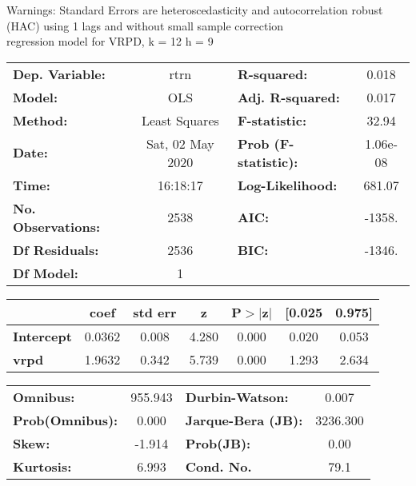 Warnings: \newline
 [1] Standard Errors are heteroscedasticity and autocorrelation robust (HAC) using 1 lags and without small sample correction\\ 

regression model for VRPD, k = 12 h = 9\begin{center}
\begin{tabular}{lclc}
\toprule
\textbf{Dep. Variable:}    &       rtrn       & \textbf{  R-squared:         } &     0.018   \\
\textbf{Model:}            &       OLS        & \textbf{  Adj. R-squared:    } &     0.017   \\
\textbf{Method:}           &  Least Squares   & \textbf{  F-statistic:       } &     32.94   \\
\textbf{Date:}             & Sat, 02 May 2020 & \textbf{  Prob (F-statistic):} &  1.06e-08   \\
\textbf{Time:}             &     16:18:17     & \textbf{  Log-Likelihood:    } &    681.07   \\
\textbf{No. Observations:} &        2538      & \textbf{  AIC:               } &    -1358.   \\
\textbf{Df Residuals:}     &        2536      & \textbf{  BIC:               } &    -1346.   \\
\textbf{Df Model:}         &           1      & \textbf{                     } &             \\
\bottomrule
\end{tabular}
\begin{tabular}{lcccccc}
                   & \textbf{coef} & \textbf{std err} & \textbf{z} & \textbf{P$> |$z$|$} & \textbf{[0.025} & \textbf{0.975]}  \\
\midrule
\textbf{Intercept} &       0.0362  &        0.008     &     4.280  &         0.000        &        0.020    &        0.053     \\
\textbf{vrpd}      &       1.9632  &        0.342     &     5.739  &         0.000        &        1.293    &        2.634     \\
\bottomrule
\end{tabular}
\begin{tabular}{lclc}
\textbf{Omnibus:}       & 955.943 & \textbf{  Durbin-Watson:     } &    0.007  \\
\textbf{Prob(Omnibus):} &   0.000 & \textbf{  Jarque-Bera (JB):  } & 3236.300  \\
\textbf{Skew:}          &  -1.914 & \textbf{  Prob(JB):          } &     0.00  \\
\textbf{Kurtosis:}      &   6.993 & \textbf{  Cond. No.          } &     79.1  \\
\bottomrule
\end{tabular}
\end{center}

